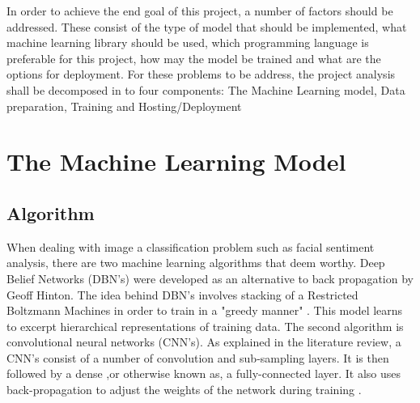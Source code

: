 In order to achieve the end goal of this project, a number of factors should be addressed. These consist of the type of model that should be implemented, what machine learning library should be used, which programming language is preferable for this project, how may the model be trained and what are the options for deployment. For these problems to be address, the project analysis shall be decomposed in to four components: The Machine Learning model, Data preparation, Training and Hosting/Deployment


 	
 	


\section{The Machine Learning Model}


\subsection{Algorithm}
When dealing with image a classification problem such as facial sentiment analysis, there are two machine learning algorithms that deem worthy. Deep Belief Networks (DBN's) were developed as an alternative to back propagation by Geoff Hinton. The idea behind DBN's involves stacking of a Restricted Boltzmann Machines in order to train in a "greedy manner" \citep{dbn}. This model learns to excerpt hierarchical representations of training data. The second algorithm is convolutional neural networks (CNN's). As explained in the literature review, a CNN's consist of a number of convolution and sub-sampling layers. It is then followed by a dense ,or otherwise known as, a fully-connected layer. It also uses back-propagation to adjust the weights of the network during training \citep{gupta}. 


